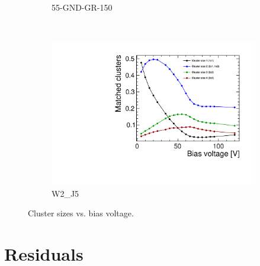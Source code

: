 \begin{figure}[htbp]
\begin{subfigure}[b]{0.33\textwidth}
    \caption{55-GND-GR-150}
  \end{subfigure}\\
  \begin{subfigure}[b]{0.33\textwidth}
    \includegraphics[width=\textwidth]{./figures/TestBeam/cluSize_bias_W0002_J05.pdf}
    \caption{W2\_J5}
  \end{subfigure}
  \caption{Cluster sizes vs. bias voltage.}
  \label{fig:clusterSize_vs_biasVoltage}
\end{figure}
\newpage
\section{Residuals}
